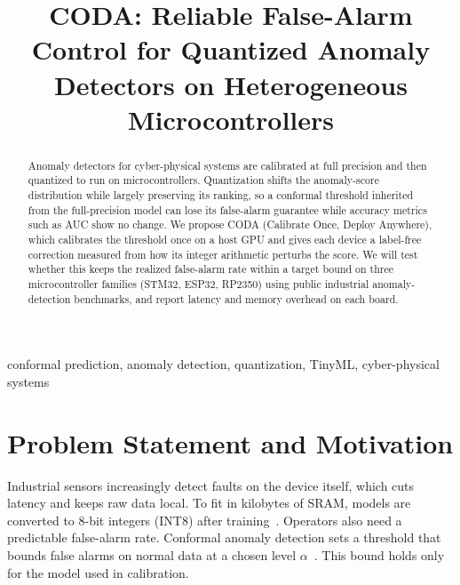\documentclass[conference]{IEEEtran}
\begin{document}
\raggedbottom

\title{CODA: Reliable False-Alarm Control for Quantized Anomaly Detectors on Heterogeneous Microcontrollers}

\author{
}

\maketitle

\begin{abstract}
Anomaly detectors for cyber-physical systems are calibrated at full precision and then quantized to run on microcontrollers. Quantization shifts the anomaly-score distribution while largely preserving its ranking, so a conformal threshold inherited from the full-precision model can lose its false-alarm guarantee while accuracy metrics such as AUC show no change. We propose CODA (Calibrate Once, Deploy Anywhere), which calibrates the threshold once on a host GPU and gives each device a label-free correction measured from how its integer arithmetic perturbs the score. We will test whether this keeps the realized false-alarm rate within a target bound on three microcontroller families (STM32, ESP32, RP2350) using public industrial anomaly-detection benchmarks, and report latency and memory overhead on each board.
\end{abstract}

\begin{IEEEkeywords}
conformal prediction, anomaly detection, quantization, TinyML, cyber-physical systems
\end{IEEEkeywords}

\section{Problem Statement and Motivation}
Industrial sensors increasingly detect faults on the device itself, which cuts latency and keeps raw data local. To fit in kilobytes of SRAM, models are converted to 8-bit integers (INT8) after training~\cite{jacob2018,david2021,lin2020}. Operators also need a predictable false-alarm rate. Conformal anomaly detection sets a threshold that bounds false alarms on normal data at a chosen level $\alpha$~\cite{bates2023,angelopoulos2023}. This bound holds only for the model used in calibration.
\end{document}
